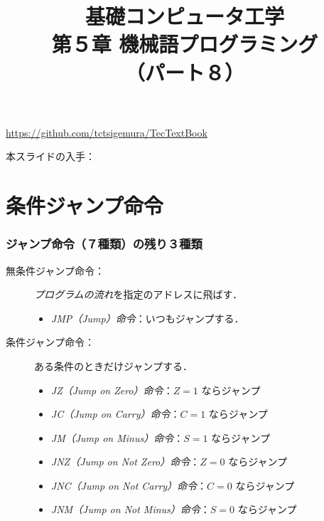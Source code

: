 \documentclass[handout]{beamer}        %
\begin{document}
\title{基礎コンピュータ工学\\第５章 機械語プログラミング\\（パート８）}
\date{}

\begin{frame}
  \titlepage
  \centerline{\url{https://github.com/tctsigemura/TecTextBook}}
  \vfill
  \centerline{本スライドの入手：
    }
\end{frame}


\section{条件ジャンプ命令}
\begin{frame}
  \frametitle{ジャンプ命令（７種類）の残り３種類}
  \begin{description}
  \item[無条件ジャンプ命令：]\emph{プログラムの流れ}を指定のアドレスに飛ばす．
    \begin{itemize}
      \item \emph{JMP（Jump）命令}：いつもジャンプする．
    \end{itemize}
    \vfill
  \item[条件ジャンプ命令：]ある条件のときだけジャンプする．
    \begin{itemize}
      \item \emph{JZ（Jump on Zero）命令}：$Z=1$ ならジャンプ
        \vfill
      \item \emph{JC（Jump on Carry）命令}：$C=1$ ならジャンプ
        \vfill
      \item \emph{JM（Jump on Minus）命令}：$S=1$ ならジャンプ
        \vfill
      \item \emph{JNZ（Jump on Not Zero）命令}：$Z=0$ ならジャンプ
        \vfill
      \item \emph{JNC（Jump on Not Carry）命令}：$C=0$ ならジャンプ
        \vfill
      \item \emph{JNM（Jump on Not Minus）命令}：$S=0$ ならジャンプ
    \end{itemize}
  \end{description}
  \vfill
\end{frame}
\end{document}
